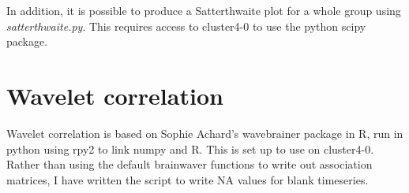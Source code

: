 \documentclass[a4paper,10pt]{article}
\begin{document}
In addition, it is possible to produce a Satterthwaite plot for a whole group using \textit{satterthwaite.py}. This requires access to cluster4-0 to use the python scipy package.

\section{Wavelet correlation}
Wavelet correlation is based on Sophie Achard's wavebrainer package in R, run in python using rpy2 to link numpy and R. This is set up to use on cluster4-0. Rather than using the default brainwaver functions to write out association matrices, I have written the script to write NA values for blank timeseries.
\end{document}
